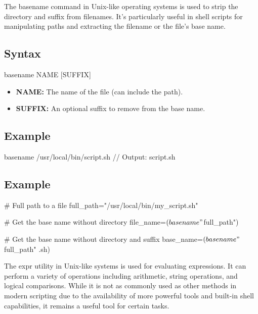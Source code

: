 \documentclass{report}
\begin{document}
    \pagebreak 
    \bigbreak \noindent 
    The basename command in Unix-like operating systems is used to strip the directory and suffix from filenames. It's particularly useful in shell scripts for manipulating paths and extracting the filename or the file's base name.
    \bigbreak \noindent 
    \subsection{Syntax}
    \bigbreak \noindent 
    \begin{bashcode}
    basename NAME [SUFFIX]
    \end{bashcode}
    \begin{itemize}
        \item \textbf{NAME:} The name of the file (can include the path).
        \item \textbf{SUFFIX:} An optional suffix to remove from the base name.
    \end{itemize}

    \bigbreak \noindent 
    \subsection{Example}
    \bigbreak \noindent 
    \begin{bashcode}
    basename /usr/local/bin/script.sh
    // Output: script.sh
    \end{bashcode}
    \bigbreak \noindent 
    \subsection{Example}
    \bigbreak \noindent 
    \begin{bashcode}
        # Full path to a file
        full_path="/usr/local/bin/my_script.sh"

        # Get the base name without directory
        file_name=$(basename "$full_path")

        # Get the base name without directory and suffix
        base_name=$(basename "$full_path" .sh)
    \end{bashcode}

    \pagebreak 
    \bigbreak \noindent 
    The expr utility in Unix-like systems is used for evaluating expressions. It can perform a variety of operations including arithmetic, string operations, and logical comparisons. While it is not as commonly used as other methods in modern scripting due to the availability of more powerful tools and built-in shell capabilities, it remains a useful tool for certain tasks.
    \bigbreak \noindent 
\end{document}
